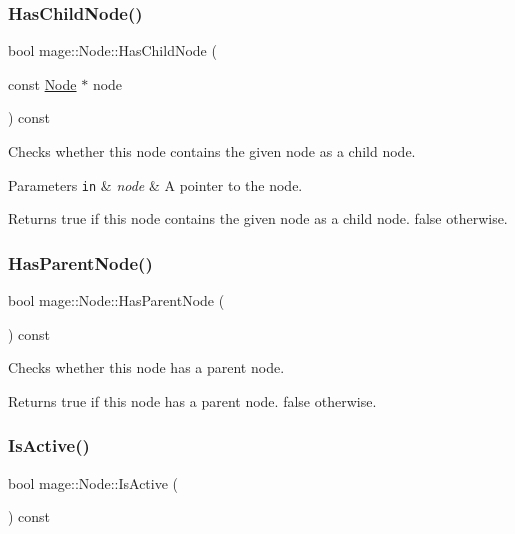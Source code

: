 \subsubsection{\texorpdfstring{Has\+Child\+Node()}{HasChildNode()}}
{\footnotesize\ttfamily bool mage\+::\+Node\+::\+Has\+Child\+Node (\begin{DoxyParamCaption}\item[{const \hyperlink{classmage_1_1_node}{Node} $\ast$}]{node }\end{DoxyParamCaption}) const}

Checks whether this node contains the given node as a child node.


\begin{DoxyParams}[1]{Parameters}
\mbox{\tt in}  & {\em node} & A pointer to the node. \\
\hline
\end{DoxyParams}
\begin{DoxyReturn}{Returns}
{\ttfamily true} if this node contains the given node as a child node. {\ttfamily false} otherwise. 
\end{DoxyReturn}
\hypertarget{classmage_1_1_node_acc47eb0f2eaa60e71fd945e79b4f622d}{}\label{classmage_1_1_node_acc47eb0f2eaa60e71fd945e79b4f622d} 
\subsubsection{\texorpdfstring{Has\+Parent\+Node()}{HasParentNode()}}
{\footnotesize\ttfamily bool mage\+::\+Node\+::\+Has\+Parent\+Node (\begin{DoxyParamCaption}{ }\end{DoxyParamCaption}) const\hspace{0.3cm}{\ttfamily [noexcept]}}

Checks whether this node has a parent node.

\begin{DoxyReturn}{Returns}
{\ttfamily true} if this node has a parent node. {\ttfamily false} otherwise. 
\end{DoxyReturn}
\hypertarget{classmage_1_1_node_a6fce6afdcfdde0e5dff5b219cee4f372}{}\label{classmage_1_1_node_a6fce6afdcfdde0e5dff5b219cee4f372} 
\subsubsection{\texorpdfstring{Is\+Active()}{IsActive()}}
{\footnotesize\ttfamily bool mage\+::\+Node\+::\+Is\+Active (\begin{DoxyParamCaption}{ }\end{DoxyParamCaption}) const\hspace{0.3cm}{\ttfamily [noexcept]}}

